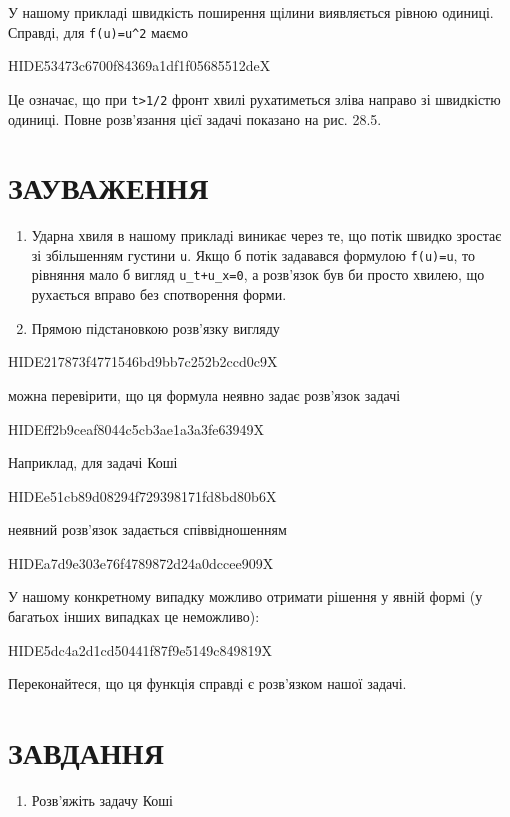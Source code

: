 \documentclass[
  ukrainian,
]{article}
\providecommand{\tightlist}{%
  \setlength{\itemsep}{0pt}\setlength{\parskip}{0pt}}
\begin{document}
У нашому прикладі швидкість поширення щілини виявляється рівною одиниці.
Справді, для \texttt{f(u)=u\^{}2} маємо

HIDE53473c6700f84369a1df1f05685512deX

Це означає, що при \texttt{t\textgreater{}1/2} фронт хвилі рухатиметься
зліва направо зі швидкістю одиниці. Повне розв'язання цієї задачі
показано на рис. 28.5.

\section{ЗАУВАЖЕННЯ}\label{ux437ux430ux443ux432ux430ux436ux435ux43dux43dux44f-8}

\begin{enumerate}
\def\labelenumi{\arabic{enumi}.}
\item
  Ударна хвиля в нашому прикладі виникає через те, що потік швидко
  зростає зі збільшенням густини \texttt{u}. Якщо б потік задавався
  формулою \texttt{f(u)=u}, то рівняння мало б вигляд
  \texttt{u\_t+u\_x=0}, а розв'язок був би просто хвилею, що рухається
  вправо без спотворення форми.
\item
  Прямою підстановкою розв'язку вигляду
\end{enumerate}

HIDE217873f4771546bd9bb7c252b2ccd0c9X

можна перевірити, що ця формула неявно задає розв'язок задачі

HIDEff2b9ceaf8044c5cb3ae1a3a3fe63949X

Наприклад, для задачі Коші

HIDEe51cb89d08294f729398171fd8bd80b6X

неявний розв'язок задається співвідношенням

HIDEa7d9e303e76f4789872d24a0dccee909X

У нашому конкретному випадку можливо отримати рішення у явній формі (у
багатьох інших випадках це неможливо):

HIDE5dc4a2d1cd50441f87f9e5149c849819X

Переконайтеся, що ця функція справді є розв'язком нашої задачі.

\section{ЗАВДАННЯ}\label{ux437ux430ux432ux434ux430ux43dux43dux44f-10}

\begin{enumerate}
\def\labelenumi{\arabic{enumi}.}
\tightlist
\item
  Розв'яжіть задачу Коші
\end{enumerate}
\end{document}
